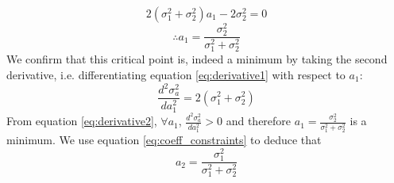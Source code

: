 \begin{equation*}
    2 \left( \sigma_1^2 + \sigma_2^2 \right) a_1 - 2 \sigma_2^2 = 0
\end{equation*}
\begin{equation}
\therefore a_1 = \frac{\sigma_2^2}{\sigma_1^2 + \sigma_2^2} \label{eq:result_a1}
\end{equation}
We confirm that this critical point is, indeed a minimum by taking the second derivative, i.e. differentiating equation \ref{eq:derivative1} with respect to $a_1$:
\begin{equation}
    \frac{d^2 \sigma_a^2}{da_1^2} = 2 \left( \sigma_1^2 + \sigma_2^2 \right) \label{eq:derivative2}
\end{equation}
From equation \ref{eq:derivative2}, $\forall a_1$, $\frac{d^2 \sigma_a^2}{da_1^2} > 0$ and therefore $a_1 = \frac{\sigma_2^2}{\sigma_1^2 + \sigma_2^2}$ is a minimum.
We use equation \ref{eq:coeff_constraints} to deduce that
\begin{equation}
    a_2 = \frac{\sigma_1^2}{\sigma_1^2 + \sigma_2^2} \label{eq:result_a2}
\end{equation}
